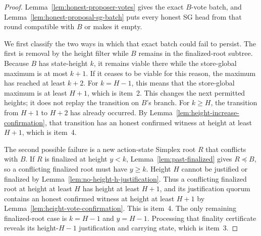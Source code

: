 \begin{proof}
Lemma~\ref{lem:honest-proposer-votes} gives the exact \(B\)-vote batch, and
Lemma~\ref{lem:honest-proposal-sg-batch} puts every honest SG head from that
round compatible with \(B\) or makes it empty.

We first classify the two ways in which that exact batch could fail to
persist.  The first is removal by the height filter while \(B\) remains in
the finalized-root subtree.  Because \(B\) has state-height \(k\), it remains
viable there while the store-global maximum is at most \(k+1\).  If it ceases
to be viable for this reason, the maximum has reached at least \(k+2\).  For
\(k=H-1\), this means that the store-global maximum is at least \(H+1\),
which is item~2.  This changes the next permitted heights; it does not replay the
transition on \(B\)'s branch.  For \(k\geq H\), the
transition from \(H+1\) to \(H+2\) has already occurred.  By
Lemma~\ref{lem:height-increase-confirmation}, that transition has an honest
confirmed witness at height at least \(H+1\), which is item~4.

The second possible failure is a new action-state Simplex root \(R\) that
conflicts with \(B\).  If \(R\) is finalized at height \(y<k\),
Lemma~\ref{lem:past-finalized} gives \(R\preceq B\), so a conflicting
finalized root must have \(y\geq k\).  Height \(H\) cannot be justified or
finalized by Lemma~\ref{lem:no-height-h-justification}.  Thus a conflicting finalized
root at height at least \(H\) has height at least \(H+1\), and its
justification quorum contains an honest confirmed witness at height at least
\(H+1\) by Lemma~\ref{lem:height-vote-confirmation}.  This is item~4.  The
only remaining finalized-root case is \(k=H-1\) and \(y=H-1\).  Processing
that finality certificate reveals its height-\(H-1\) justification and
carrying state, which is item~3.


\end{proof}

